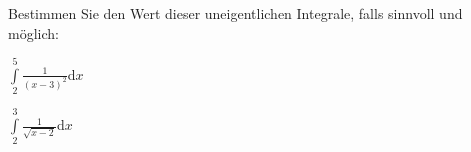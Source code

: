 \item
Bestimmen Sie den Wert dieser uneigentlichen Integrale, falls sinnvoll und möglich:
\begin{enumerate}
\begin{multicols}{2}
\item $\int\limits_2^5 \frac{1}{(x-3)^2}$d$x$
\item $\int\limits_2^3 \frac{1}{\sqrt{x-2}}$d$x$
\end{multicols}
\end{enumerate}

